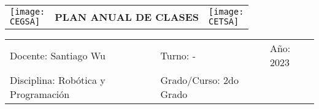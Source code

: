 \documentclass[landscape, a4paper, 10pt]{article}
\newcommand{\profesor}{Santiago Wu}
\newcommand{\discipline}{Robótica y Programación}
\newcommand{\currentyear}{2023}
\newcommand{\CEGSA}{cegsa-logo.png}
\newcommand{\CETSA}{cetsa-logo.png}
\begin{document}
	\pagebreak[4]
	\begin{tabularx}{\textwidth}{ >{\raggedright\arraybackslash}X >{\centering\arraybackslash}X >{\raggedleft\arraybackslash}X }
		\texttt{[image: \\CEGSA]} &
		\textbf{PLAN ANUAL DE CLASES} &
		\texttt{[image: \\CETSA]}
	\end{tabularx}
	\begin{tabularx}{\textwidth}{ >{\raggedright\arraybackslash}X >{\raggedright\arraybackslash}X >{\raggedright\arraybackslash}X }
		Docente: \profesor &
		Turno: - &
		Año: \currentyear \\
		Disciplina: \discipline &
		Grado/Curso: 2do Grado &
		 \\
	\end{tabularx}
	\centering
\end{document}
